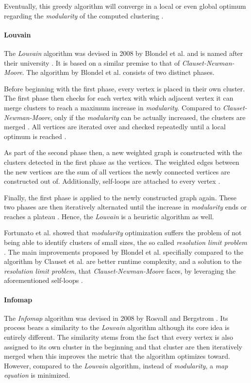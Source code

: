 \documentclass[12pt,a4paper]{report}
\begin{document}
Eventually, this greedy algorithm will converge in a local or even global
optimum regarding the \textit{modularity} of the computed clustering
\cite{clauset2004modularity}.

\paragraph{Louvain \cite{blondel2008modularity}}
The \textit{Louvain} algorithm was devised in 2008 by Blondel et al. and is
named after their university \cite{blondel2008modularity}.
It is based on a similar premise to that of \textit{Clauset-Newman-Moore}.
The algorithm by Blondel et al. consists of two distinct phases.

Before beginning with the first phase, every vertex is placed in their own cluster.
The first phase then checks for each vertex with which adjacent vertex it can
merge clusters to reach a maximum increase in \textit{modularity}.
Compared to \textit{Clauset-Newman-Moore}, only if the \textit{modularity}
can be actually increased, the clusters are merged \cite{blondel2008modularity}.
All vertices are iterated over and checked repeatedly until a local optimum
is reached \cite{blondel2008modularity}.

As part of the second phase then, a new weighted graph is constructed with
the clusters detected in the first phase as the vertices.
The weighted edges between the new vertices are the sum of all vertices
the newly connected vertices are constructed out of.
Additionally, self-loops are attached to every vertex \cite{blondel2008modularity}.

Finally, the first phase is applied to the newly constructed graph again.
These two phases are then iteratively alternated until the increase in
\textit{modularity} ends or reaches a plateau \cite{blondel2008modularity}.
Hence, the \textit{Louvain} is a heuristic algorithm as well.

Fortunato et al. showed that \textit{modularity} optimization suffers
the problem of not being able to identify clusters of small sizes, the so called
\textit{resolution limit problem} \cite{fortunato2007resolution}.
The main improvements proposed by Blondel et al. specifially compared
to the algorithm by Clauset et al. are better runtime complexity, and a solution
to the \textit{resolution limit problem}, that \textit{Clauset-Newman-Moore}
faces, by leveraging the aforementioned self-loops \cite{blondel2008modularity}.

\paragraph{Infomap \cite{rosvall2008infomap}}
The \textit{Infomap} algorithm was devised in 2008 by Rosvall and Bergstrom
\cite{rosvall2008infomap}.
Its process bears a similarity to the \textit{Louvain} algorithm although
its core idea is entirely different. The similarity stems from the fact
that every vertex is also assigned to its own cluster in the beginning and
that cluster are then iteratively merged when this improves the metric that
the algorithm optimizes toward. However, compared to the \textit{Louvain}
algorithm, instead of \textit{modularity}, a \textit{map equation} is minimized.
\end{document}
